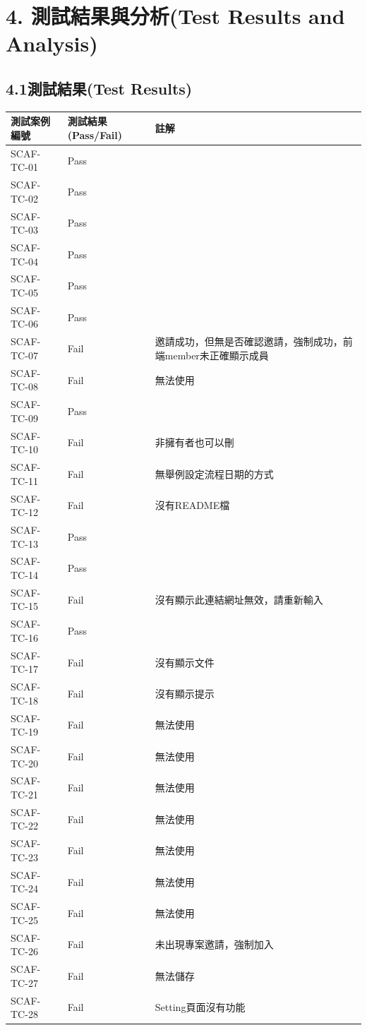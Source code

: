 \documentclass{report}
\begin{document}
\section*{4. 測試結果與分析(Test Results and Analysis)}
\subsection*{4.1測試結果(Test Results)}
\begin{tabularx}{\textwidth}{
  |p{}%
  |p{}%
  |p{}|%
}
  \hline
  測試案例編號 & 測試結果(Pass/Fail) & 註解 \\ \hline
  SCAF-TC-01 & Pass &  \\ \hline
  SCAF-TC-02 & Pass &  \\ \hline
  SCAF-TC-03 & Pass &  \\ \hline
  SCAF-TC-04 & Pass &  \\ \hline
  SCAF-TC-05 & Pass &  \\ \hline
  SCAF-TC-06 & Pass &  \\ \hline
  SCAF-TC-07 & Fail & 邀請成功，但無是否確認邀請，強制成功，前端member未正確顯示成員 \\ \hline
  SCAF-TC-08 & Fail & 無法使用 \\ \hline
  SCAF-TC-09 & Pass &  \\ \hline
  SCAF-TC-10 & Fail & 非擁有者也可以刪 \\ \hline
  SCAF-TC-11 & Fail & 無舉例設定流程日期的方式 \\ \hline
  SCAF-TC-12 & Fail & 沒有README檔 \\ \hline
  SCAF-TC-13 & Pass &  \\ \hline
  SCAF-TC-14 & Pass &  \\ \hline
  SCAF-TC-15 & Fail & 沒有顯示此連結網址無效，請重新輸入 \\ \hline
  SCAF-TC-16 & Pass &  \\ \hline
  SCAF-TC-17 & Fail & 沒有顯示文件 \\ \hline
  SCAF-TC-18 & Fail & 沒有顯示提示 \\ \hline
  SCAF-TC-19 & Fail & 無法使用 \\ \hline
  SCAF-TC-20 & Fail & 無法使用 \\ \hline
  SCAF-TC-21 & Fail & 無法使用 \\ \hline
  SCAF-TC-22 & Fail & 無法使用 \\ \hline
  SCAF-TC-23 & Fail & 無法使用 \\ \hline
  SCAF-TC-24 & Fail & 無法使用 \\ \hline
  SCAF-TC-25 & Fail & 無法使用\\ \hline
  SCAF-TC-26 & Fail & 未出現專案邀請，強制加入 \\ \hline
  SCAF-TC-27 & Fail & 無法儲存 \\ \hline
  SCAF-TC-28 & Fail & Setting頁面沒有功能 \\ \hline
\end{tabularx}
\\
\newline
\\
\end{document}
